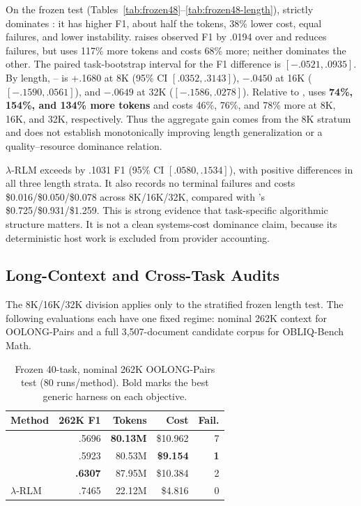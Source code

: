 On the frozen test (Tables~\ref{tab:frozen48}--\ref{tab:frozen48-length}), \hzerostar{} strictly dominates
\hzero{}: it has higher F1, about half the tokens, 38\% lower cost, equal
failures, and lower instability. \shrlm{} raises observed F1 by .0194 over
\hzerostar{} and reduces failures, but uses 117\% more tokens and costs 68\%
more; neither dominates the other. The paired task-bootstrap interval for the
F1 difference is $[-.0521,.0935]$. By length, \shrlm{}--\hzerostar{} is +.1680
at 8K (95\% CI $[.0352,.3143]$), $-.0450$ at 16K
($[-.1590,.0561]$), and $-.0649$ at 32K ($[-.1586,.0278]$). Relative to
\hzerostar{}, \shrlm{} uses \textbf{74\%, 154\%, and 134\% more tokens} and
costs 46\%, 76\%, and 78\% more at 8K, 16K, and 32K, respectively. Thus the
aggregate gain comes from the 8K stratum and does not establish monotonically
improving length generalization or a quality--resource dominance relation.

$\lambda$-RLM exceeds \shrlm{} by .1031 F1 (95\% CI $[.0580,.1534]$), with
positive differences in all three length strata. It also records no terminal
failures and costs \$0.016/\$0.050/\$0.078 across 8K/16K/32K, compared with
\shrlm{}'s \$0.725/\$0.931/\$1.259. This is strong evidence that task-specific
algorithmic structure matters. It is not a clean systems-cost dominance claim,
because its deterministic host work is excluded from provider accounting.

\subsection{Long-Context and Cross-Task Audits}

The 8K/16K/32K division applies only to the stratified frozen length test.
The following evaluations each have one fixed regime: nominal 262K context for
OOLONG-Pairs and a full 3,507-document candidate corpus for OBLIQ-Bench Math.

\begin{table}[ht]
\centering\small
\setlength{\tabcolsep}{4pt}
\begin{tabular}{@{}lrrrr@{}}
\toprule
Method & 262K F1 & Tokens & Cost & Fail. \\
\midrule
\hzero{}      & .5696 & \textbf{80.13M} & \$10.962 & 7 \\
\hzerostar{}  & .5923 & 80.53M & \textbf{\$9.154}  & \textbf{1} \\
\shrlm{}      & \textbf{.6307} & 87.95M & \$10.384 & 2 \\
$\lambda$-RLM & .7465 & 22.12M & \$4.816  & 0 \\
\bottomrule
\end{tabular}
\caption{Frozen 40-task, nominal 262K OOLONG-Pairs test (80 runs/method).
Bold marks the best generic harness on each objective.}
\label{tab:long}
\end{table}

